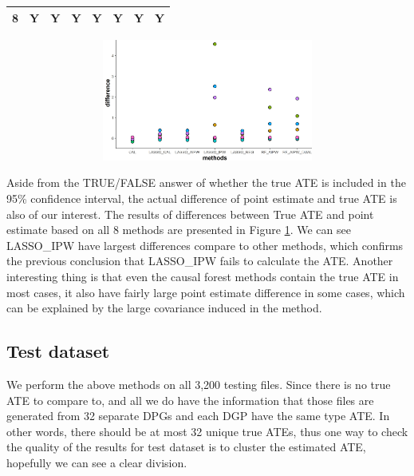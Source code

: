 \documentclass[11pt, oneside]{article}
\begin{document}
\begin{table}[h]
\begin{minipage}{0.44\textwidth}
{\begin{tabular}{@{}cccccccc@{}}
8                 & Y                    & Y                                                                     & Y                                                                    & Y                                                                    & Y                                                                    & Y                                                                  & Y                                                                        \\ \bottomrule
\end{tabular}}
\end{minipage}
  \hfill
  \begin{minipage}{0.50\textwidth}
\includegraphics[width=1\textwidth, height=4cm]{../plot/comparison_diffcut.jpg}
    \label{fig:pointdifflow}
   \end{minipage}
\end{table}
Aside from the TRUE/FALSE answer of whether the true ATE is included in the 95\% confidence interval, the actual difference of point estimate and true ATE is also of our interest. The results of differences between True ATE and point estimate based on all 8 methods are presented in Figure \ref{fig:pointdifflow}. We can see LASSO\_IPW have largest differences compare to other methods, which confirms the previous conclusion that LASSO\_IPW fails to calculate the ATE. Another interesting thing is that even the causal forest methods contain the true ATE in most cases, it also have fairly large point estimate difference in some cases, which can be explained by the large covariance induced in the method. 

\subsection{Test dataset}
We perform the above methods on all 3,200 testing files. Since there is no true ATE to compare to, and all we do have the information that those files are generated from 32 separate DPGs and each DGP have the same type ATE. In other words, there should be at most 32 unique true ATEs, thus one way to check the quality of the results for test dataset is to cluster the estimated ATE, hopefully we can see a clear division. 
\end{document}
